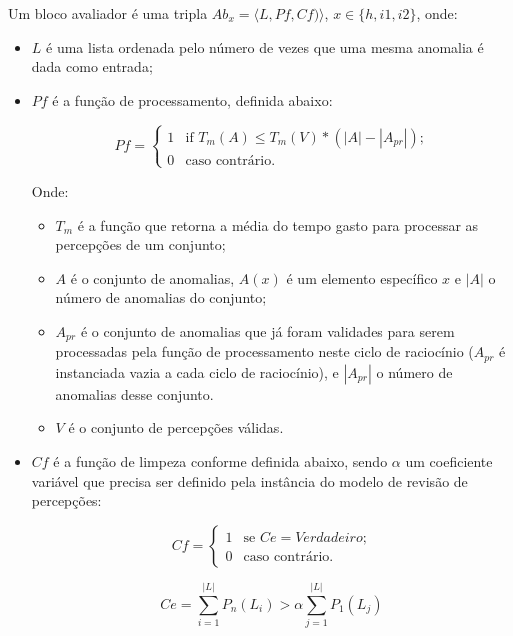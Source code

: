 \begin{definition}
    Um bloco avaliador é uma tripla $Ab_{x} = \langle L, Pf, Cf) \rangle$, $x \in \{h, i1, i2\}$, onde:

    \begin{itemize}
        \item $L$ é uma lista ordenada pelo número de vezes que uma mesma anomalia é dada como entrada;
        \item $Pf$ é a função de processamento, definida abaixo:
            
             \[ Pf = \left\{ \begin{array}{ll}
                        1 & \mbox{if $T_{m}(A) \leq T_{m}(V) * (|A| - |A_{pr}|)$;}\\
                        0 & \mbox{caso contrário}.\end{array} \right. \]
        
            
            Onde:
            
            \begin{itemize}
                \item $T_{m}$ é a função que retorna a média do tempo gasto para processar as percepções de um conjunto;
                \item $A$ é o conjunto de anomalias, $A(x)$ é um elemento específico $x$ e $|A|$ o número de anomalias do conjunto;
                \item $A_{pr}$ é o conjunto de anomalias que já foram validades para serem processadas pela função de processamento neste ciclo de raciocínio ($A_{pr}$ é instanciada vazia a cada ciclo de raciocínio), e $|A_{pr}|$ o número de anomalias desse conjunto.
                \item $V$ é o conjunto de percepções válidas.
            \end{itemize}{}
        
        \item $Cf$ é a função de limpeza conforme definida abaixo, sendo $\alpha$ um coeficiente variável que precisa ser definido pela instância do modelo de revisão de percepções:
        
        \[ Cf = \left\{ \begin{array}{ll}
                        1 & \mbox{se  $Ce = Verdadeiro$;}\\
                        0 & \mbox{caso contrário}.\end{array} \right. \]
            
            \[ Ce = \sum_{i=1}^{|L|} P_{n}(L_{i}) > \alpha \sum_{j=1}^{|L|} P_{1}(L_{j}) \]
            

\end{itemize}
\end{definition}
